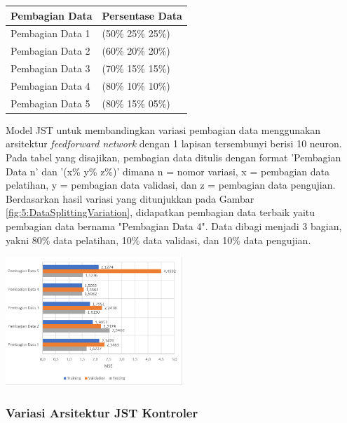 \documentclass[a4paper,10pt]{article}
\makeatletter
\newenvironment{body}{\begin{multicols}{2}}{\end{multicols}}
\renewenvironment{table}
{\def\@captype{table}%
	\captionsetup{format=plain,labelsep=newline,font=footnotesize,textfont=sc,justification=centering}%
	\fontsize{8}{8}\selectfont
}
{}
\renewenvironment{figure}
{\def\@captype{figure}%
	\captionsetup{labelsep=period,format=hang,font=footnotesize,justification=justified}
}
{}
\makeatother
\begin{document}
\begin{body}
		\begin{table}
			\centering
			\caption{Tabel Daftar Variasi Pembagian Data}
			\label{tbl:5:NeuronVariation}
			\begin{tabularx}{\linewidth}{XX}\toprule
				\textbf{Pembagian Data} & \textbf{Persentase Data} \\ \toprule
				Pembagian Data 1 & (50\% 25\% 25\%) \\ \midrule
				Pembagian Data 2 & (60\% 20\% 20\%) \\ \midrule
				Pembagian Data 3 & (70\% 15\% 15\%) \\ \midrule
				Pembagian Data 4 & (80\% 10\% 10\%) \\ \midrule
				Pembagian Data 5 & (80\% 15\% 05\%) \\ \bottomrule
			\end{tabularx}
		\end{table}
		\vspace{1em}
		
		Model JST untuk membandingkan variasi pembagian data menggunakan arsitektur \textit{feedforward network} dengan 1 lapisan tersembunyi berisi 10 neuron. Pada tabel yang disajikan, pembagian data ditulis dengan format ’Pembagian Data n’ dan ’(x\% y\% z\%)’ dimana n = nomor variasi, x = pembagian data pelatihan, y = pembagian data validasi, dan z = pembagian data pengujian. Berdasarkan hasil variasi yang ditunjukkan pada Gambar \ref{fig:5:DataSplittingVariation}, didapatkan pembagian data terbaik yaitu pembagian data bernama "Pembagian Data 4". Data dibagi menjadi 3 bagian, yakni 80\% data pelatihan, 10\% data validasi, dan 10\% data pengujian.\\
		
		\begin{figure}
			\centering
			\includegraphics[width=0.5\textwidth]{figures/VariasiPembagianDataJSTKontroler}
			\caption{Grafik Variasi Pembagian Data}
			\label{fig:5:DataSplittingVariation}
		\end{figure}
		
		\subsubsection{Variasi Arsitektur JST Kontroler}
		

\end{body}
\end{document}

